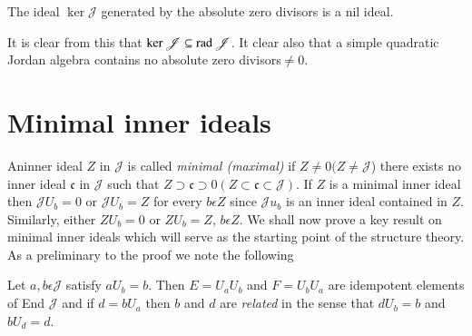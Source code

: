 \begin{thm}\label{c3:thm5}
The ideal $\ker \mathscr{J}$ generated by the absolute zero divisors is
a nil ideal.
\end{thm}

It is clear from this that $\ker \mathscr{J}\subseteq \operatorname{rad}
\mathscr{J}$. It clear also that a simple quadratic Jordan algebra
contains no absolute zero divisors$\neq0$.

\section{Minimal inner ideals}\label{c3:sec4}

An\pageoriginale inner ideal $Z$ in $\mathscr{J}$ is called
{\em minimal (maximal)} if $Z \neq 0 (Z \neq
\mathscr{J}$) there exists no inner ideal $\mathfrak{c}$ in
$\mathscr{J}$ such that $Z\supset\mathfrak{c}\supset
0(Z\subset\mathfrak{c}\subset\mathscr{J})$. If
$Z$ is a minimal inner ideal then $\mathscr{J}U_b=0$ or
$\mathscr{J}U_b=Z$ for every $b\epsilon Z$ since
$\mathscr{J} u_b$ is an inner ideal contained in
$Z$. Similarly, either $ZU_b=0$ or
$Z U_b=Z$, $b\epsilon Z$. We shall
now prove a key result on minimal inner ideals which will serve as the
starting point of the structure theory. As a preliminary to the proof
we note the following

\begin{lemma*}
Let $a,b\epsilon \mathscr{J}$ satisfy $aU_b=b$. Then $E=U_aU_b$ and
$F=U_bU_a$ are idempotent elements of End $\mathscr{J}$ and if
$d=bU_a$ then $b$ and $d$ are {\em related} in the sense that $dU_b=b$
and $bU_d=d$.
\end{lemma*}

